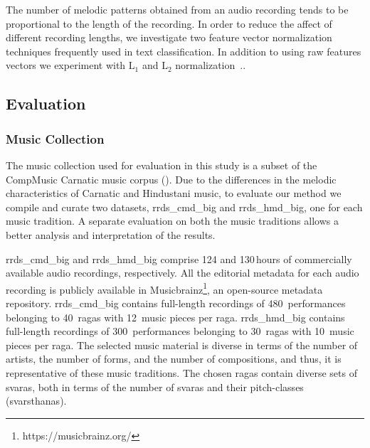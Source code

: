 The number of melodic patterns obtained from an audio recording tends to be proportional to the length of the recording. In order to reduce the affect of different recording lengths, we investigate two feature vector normalization techniques frequently used in text classification. In addition to using raw features vectors we experiment with $\mathrm{L}_1$ and $\mathrm{L}_2$ normalization~\cite{leopold2002text}.. 



\subsection{Evaluation}
\label{sec:raga_rec_pattern_evaluation}

\subsubsection{Music Collection}
\label{sec:raga_rec_pattern_music_collection}

The music collection used for evaluation in this study is a subset of the CompMusic Carnatic music corpus (). Due to the differences in the melodic characteristics of Carnatic and Hindustani music, to evaluate our method we compile and curate two datasets, \acrshort{rrds_cmd_big} and \acrshort{rrds_hmd_big}, one for each music tradition. A separate evaluation on both the music traditions allows a better analysis and interpretation of the results.

\acrshort{rrds_cmd_big} and \acrshort{rrds_hmd_big} comprise 124 and 130\,hours of commercially available audio recordings, respectively. All the editorial metadata for each audio recording is publicly available in Musicbrainz\footnote{https://musicbrainz.org/}, an open-source metadata repository. \acrshort{rrds_cmd_big} contains full-length recordings of 480~performances belonging to 40~\glspl{raga} with 12~music pieces per \gls{raga}. \acrshort{rrds_hmd_big} contains full-length recordings of 300~performances belonging to 30~\glspl{raga} with 10~music pieces per \gls{raga}. The selected music material is diverse in terms of the number of artists, the number of forms, and the number of compositions, and thus,  it is representative of these music traditions. The chosen \glspl{raga} contain diverse sets of \glspl{svara}, both in terms of the number of \glspl{svara} and their pitch-classes (\glspl{svarsthana}).

